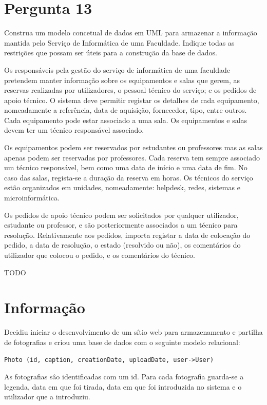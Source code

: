 {\section{Pergunta 13}
Construa um modelo concetual de dados em UML para armazenar a informação mantida pelo Serviço de Informática de uma Faculdade. Indique todas as restrições que possam ser úteis para a construção da base de dados.

Os responsáveis pela gestão do serviço de informática de uma faculdade pretendem manter informação sobre os equipamentos e salas que gerem, as reservas realizadas por utilizadores, o pessoal técnico do serviço; e os pedidos de apoio técnico. O sistema deve permitir registar os detalhes de cada equipamento, nomeadamente a referência, data de aquisição, fornecedor, tipo, entre outros. Cada equipamento pode estar associado a uma sala. Os equipamentos e salas devem ter um técnico responsável associado.

Os equipamentos podem ser reservados por estudantes ou professores mas as salas apenas podem ser reservadas por professores. Cada reserva tem sempre associado um técnico responsável, bem como uma data de início e uma data de fim. No caso das salas, regista-se a duração da reserva em horas. Os técnicos do serviço estão organizados em unidades, nomeadamente: helpdesk, redes, sistemas e microinformática.

Os pedidos de apoio técnico podem ser solicitados por qualquer utilizador, estudante ou professor, e são posteriormente associados a um técnico para resolução. Relativamente aos pedidos, importa registar a data de colocação do pedido, a data de resolução, o estado (resolvido ou não), os comentários do utilizador que colocou o pedido, e os comentários do técnico.

\ansseparator

TODO

\section*{Informação}
Decidiu iniciar o desenvolvimento de um sítio web para armazenamento e partilha de fotografias e criou uma base de dados com o seguinte modelo relacional:

\begin{lstlisting}[numbers=none]
Photo (id, caption, creationDate, uploadDate, user->User)
\end{lstlisting}

As fotografias sâo identificadas com um id. Para cada fotografia guarda-se a legenda, data em que foi tirada, data em que foi introduzida no sistema e o utilizador que a introduziu.

}
